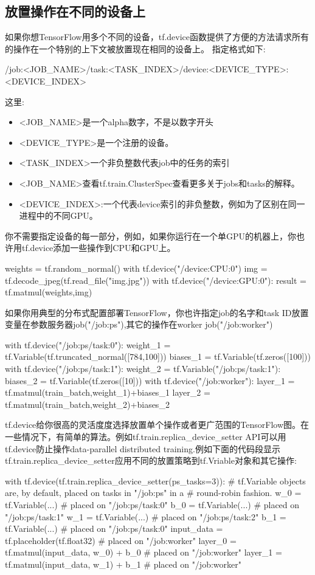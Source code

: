 \subsection{放置操作在不同的设备上}
如果你想TensorFlow用多个不同的设备，tf.device函数提供了方便的方法请求所有的操作在一个特别的上下文被放置现在相同的设备上。
指定格式如下:
\begin{python}
/job:<JOB_NAME>/task:<TASK_INDEX>/device:<DEVICE_TYPE>:<DEVICE_INDEX>
\end{python}
这里:
\begin{itemize}
\item <JOB\_NAME>是一个alpha数字，不是以数字开头
\item <DEVICE\_TYPE>是一个注册的设备。
\item <TASK\_INDEX>一个非负整数代表job中的任务的索引
\item <JOB\_NAME>查看tf.train.ClusterSpec查看更多关于jobs和tasks的解释。
\item <DEVICE\_INDEX>:一个代表device索引的非负整数，例如为了区别在同一进程中的不同GPU。
\end{itemize}
你不需要指定设备的每一部分，例如，如果你运行在一个单GPU的机器上，你也许用tf.device添加一些操作到CPU和GPU上。
\begin{python}
weights = tf.random_normal()
with tf.device("/device:CPU:0")
    img = tf.decode_jpeg(tf.read_file("img.jpg"))
with tf.device("/device:GPU:0"):
    result = tf.matmul(weights,img)
\end{python}
如果你用典型的分布式配置部署TensorFlow，你也许指定job的名字和task ID放置变量在参数服务器job("/job:ps"),其它的操作在worker job("/job:worker")
\begin{python}
with tf.device("/job:ps/task:0"):
    weight_1 = tf.Variable(tf.truncated_normal([784,100]))
    biases_1 = tf.Variable(tf.zeros([100]))
with tf.device("/job:ps/task:1"):
    weight_2 = tf.Variable("/job:ps/task:1"):
    biases_2 = tf.Variable(tf.zeros([10]))
with tf.device("/job:worker"):
    layer_1 = tf.matmul(train_batch,weight_1)+biases_1
    layer_2 = tf.matmul(train_batch,weight_2)+biases_2
\end{python}
tf.device给你很高的灵活度度选择放置单个操作或者更广范围的TensorFlow图。在一些情况下，有简单的算法。例如tf.train.replica\_device\_setter API可以用tf.device防止操作data-parallel distributed training.例如下面的代码段显示tf.train.replica\_device\_setter应用不同的放置策略到tf.Vriable对象和其它操作:
\begin{python}
with tf.device(tf.train.replica_device_setter(ps_tasks=3)):
# tf.Variable objects are, by default, placed on tasks in "/job:ps" in a
# round-robin fashion.
    w_0 = tf.Variable(...)  # placed on "/job:ps/task:0"
    b_0 = tf.Variable(...)  # placed on "/job:ps/task:1"
    w_1 = tf.Variable(...)  # placed on "/job:ps/task:2"
    b_1 = tf.Variable(...)  # placed on "/job:ps/task:0"
    input_data = tf.placeholder(tf.float32)     # placed on "/job:worker"
    layer_0 = tf.matmul(input_data, w_0) + b_0  # placed on "/job:worker"
    layer_1 = tf.matmul(input_data, w_1) + b_1  # placed on "/job:worker"
\end{python}
